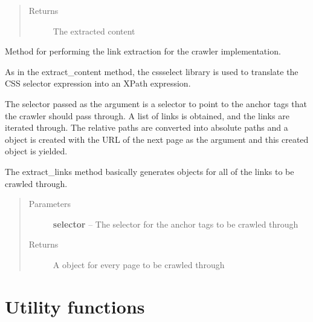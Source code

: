 \documentclass[letterpaper,12pt,english]{sphinxmanual}
\begin{document}
\begin{fulllineitems}
\begin{fulllineitems}
\begin{quote}
\begin{description}
\begin{itemize}
\end{itemize}

\item[{Returns}] \leavevmode
The extracted content

\end{description}\end{quote}

\end{fulllineitems}


\begin{fulllineitems}
\label{implementation/selectors:scrapple.selectors.css.CssSelector.extract_links}
Method for performing the link extraction for the crawler implementation.

As in the extract\_content method, the cssselect library is used to translate            the CSS selector expression into an XPath expression.

The selector passed as the argument is a selector to point to the anchor tags           that the crawler should pass through. A list of links is obtained, and the links                are iterated through. The relative paths are converted into absolute paths and          a  object is created with the URL of the next page as the argument               and this created object is yielded.

The extract\_links method basically generates  objects for all of                 the links to be crawled through.
\begin{quote}\begin{description}
\item[{Parameters}] \leavevmode
\textbf{selector} -- The selector for the anchor tags to be crawled through

\item[{Returns}] \leavevmode
A  object for every page to be crawled through

\end{description}\end{quote}

\end{fulllineitems}


\end{fulllineitems}



\section{Utility functions}
\label{implementation/utils::doc}\label{implementation/utils:module-scrapple.utils.dynamicdispatch}\label{implementation/utils:implementation-utils}\label{implementation/utils:utility-functions}
\end{document}
